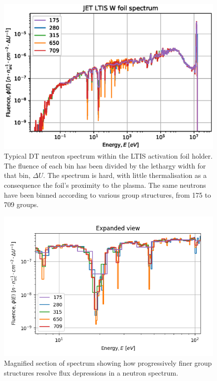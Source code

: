 \begin{figure}[h!]
\label{fig:spectrum}
\centering
\includegraphics[width=\linewidth]{W186_spectra_diff_groups.eps}
\caption{Typical DT neutron spectrum within the LTIS activation foil holder. The fluence of each bin has been divided by the lethargy width for that bin, $\Delta U$. The spectrum is hard, with little thermalisation as a consequence the foil's proximity to the plasma. The same neutrons have been binned according to various group structures, from 175 to 709 groups.}
\end{figure}

\begin{figure}[h!]
\label{fig:spectrum_detail}
\centering
\includegraphics[width=\linewidth]{w_spectrum_detail}
\caption{Magnified section of spectrum showing how progressively finer group structures resolve flux depressions in a neutron spectrum.}
\end{figure}

